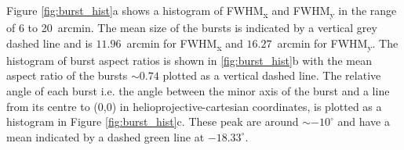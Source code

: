 

Figure \ref{fig:burst_hist}a shows a histogram of FWHM\textsubscript{x} and FWHM\textsubscript{y} in the range of 6 to 20~arcmin. The mean size of the bursts is indicated by a vertical grey dashed line and is $11.96$~arcmin for FWHM\textsubscript{x} and $16.27$~arcmin for FWHM\textsubscript{y}. The histogram of burst aspect ratios is shown in \ref{fig:burst_hist}b with the mean aspect ratio of the bursts $\sim 0.74$ plotted as a vertical dashed line. 
The relative angle of each burst i.e. the angle between the minor axis of the burst and a line from its centre to (0,0) in helioprojective-cartesian coordinates, is plotted as a histogram in Figure \ref{fig:burst_hist}c. These peak are around $\sim -10^\circ$ and have a mean indicated by a dashed green line at $-18.33^\circ$.

